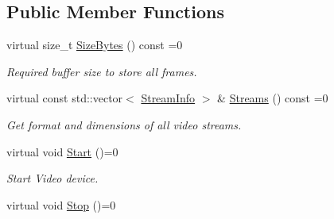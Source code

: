 \subsection*{Public Member Functions}
\begin{DoxyCompactItemize}
\item 
virtual size\+\_\+t \hyperlink{structpangolin_1_1_video_interface_aed7fea9dc63866772c9d22a8545bdbe3}{Size\+Bytes} () const =0\hypertarget{structpangolin_1_1_video_interface_aed7fea9dc63866772c9d22a8545bdbe3}{}\label{structpangolin_1_1_video_interface_aed7fea9dc63866772c9d22a8545bdbe3}

\begin{DoxyCompactList}\small\item\em Required buffer size to store all frames. \end{DoxyCompactList}\item 
virtual const std\+::vector$<$ \hyperlink{classpangolin_1_1_stream_info}{Stream\+Info} $>$ \& \hyperlink{structpangolin_1_1_video_interface_aa10c0140155901f72644c7cbefa60dcf}{Streams} () const =0\hypertarget{structpangolin_1_1_video_interface_aa10c0140155901f72644c7cbefa60dcf}{}\label{structpangolin_1_1_video_interface_aa10c0140155901f72644c7cbefa60dcf}

\begin{DoxyCompactList}\small\item\em Get format and dimensions of all video streams. \end{DoxyCompactList}\item 
virtual void \hyperlink{structpangolin_1_1_video_interface_ad8a3b10a57d445fc12a428d2e13571a3}{Start} ()=0\hypertarget{structpangolin_1_1_video_interface_ad8a3b10a57d445fc12a428d2e13571a3}{}\label{structpangolin_1_1_video_interface_ad8a3b10a57d445fc12a428d2e13571a3}

\begin{DoxyCompactList}\small\item\em Start Video device. \end{DoxyCompactList}\item 
virtual void \hyperlink{structpangolin_1_1_video_interface_a46d5b54918e44de024254b323895f111}{Stop} ()=0\hypertarget{structpangolin_1_1_video_interface_a46d5b54918e44de024254b323895f111}{}\label{structpangolin_1_1_video_interface_a46d5b54918e44de024254b323895f111}


\end{DoxyCompactItemize}

